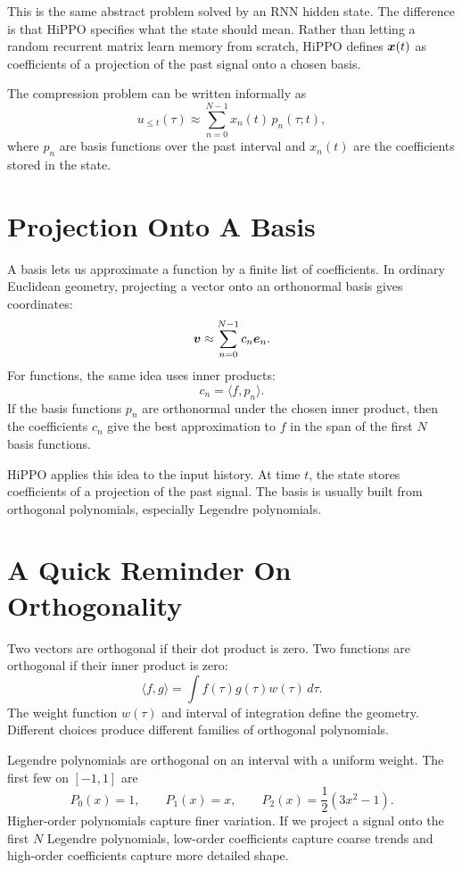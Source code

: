 This is the same abstract problem solved by an RNN hidden state. The difference is that
HiPPO specifies what the state should mean. Rather than letting a random recurrent matrix
learn memory from scratch, HiPPO defines $\bm{x}(t)$ as coefficients of a projection of the
past signal onto a chosen basis.

The compression problem can be written informally as
\[
  u_{\leq t}(\tau)
  \approx
  \sum_{n=0}^{N-1} x_n(t)\,p_n(\tau;t),
\]
where $p_n$ are basis functions over the past interval and $x_n(t)$ are the coefficients
stored in the state.

\section{Projection Onto A Basis}

A basis lets us approximate a function by a finite list of coefficients. In ordinary
Euclidean geometry, projecting a vector onto an orthonormal basis gives coordinates:
\[
  \bm{v} \approx \sum_{n=0}^{N-1} c_n \bm{e}_n.
\]
For functions, the same idea uses inner products:
\[
  c_n = \langle f, p_n\rangle.
\]
If the basis functions $p_n$ are orthonormal under the chosen inner product, then the
coefficients $c_n$ give the best approximation to $f$ in the span of the first $N$ basis
functions.

HiPPO applies this idea to the input history. At time $t$, the state stores coefficients
of a projection of the past signal. The basis is usually built from orthogonal
polynomials, especially Legendre polynomials.

\section{A Quick Reminder On Orthogonality}

Two vectors are orthogonal if their dot product is zero. Two functions are orthogonal if
their inner product is zero:
\[
  \langle f,g\rangle
  =
  \int f(\tau)g(\tau)w(\tau)\,d\tau.
\]
The weight function $w(\tau)$ and interval of integration define the geometry. Different
choices produce different families of orthogonal polynomials.

Legendre polynomials are orthogonal on an interval with a uniform weight. The first few
on $[-1,1]$ are
\[
  P_0(x)=1,\qquad
  P_1(x)=x,\qquad
  P_2(x)=\frac{1}{2}(3x^2-1).
\]
Higher-order polynomials capture finer variation. If we project a signal onto the first
$N$ Legendre polynomials, low-order coefficients capture coarse trends and high-order
coefficients capture more detailed shape.

